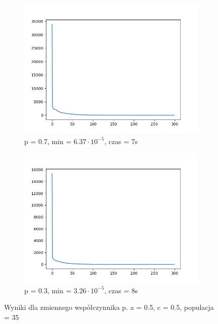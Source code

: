\documentclass[12pt]{article}
\begin{document}
\begin{figure}[H]
    \centering
    \begin{subfigure}{0.49\textwidth}
        \centering
        \includegraphics[width=\linewidth]{plots/BOA/4_best.png}
        \caption{p = 0.7, min = $6.37\cdot 10^{-5}$, czas = 7s}
    \end{subfigure}
    \begin{subfigure}{0.49\textwidth}
        \centering
        \includegraphics[width=\linewidth]{plots/BOA/5_best.png}
        \caption{p = 0.3, min = $3.26\cdot 10^{-5}$, czas = 8s}
    \end{subfigure}
    \caption{Wyniki dla zmiennego współczynnika p. a = 0.5, c = 0.5, populacja = 35}
\end{figure}
\end{document}
